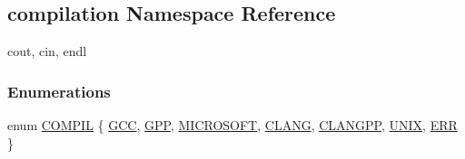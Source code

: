 \hypertarget{namespacecompilation}{}\subsection{compilation Namespace Reference}
\label{namespacecompilation}


cout, cin, endl  


\subsubsection*{Enumerations}
\begin{DoxyCompactItemize}
\item 
enum \mbox{\hyperlink{namespacecompilation_ab8b552e73f4f5a4912982468f052f089}{C\+O\+M\+P\+IL}} \{ \newline
\mbox{\hyperlink{namespacecompilation_ab8b552e73f4f5a4912982468f052f089a18612fab061fb5a500862d24f90d5caf}{G\+CC}}, 
\mbox{\hyperlink{namespacecompilation_ab8b552e73f4f5a4912982468f052f089a3db140f70bad153a259160096857dd4f}{G\+PP}}, 
\mbox{\hyperlink{namespacecompilation_ab8b552e73f4f5a4912982468f052f089ae1c2380a9921008e2f3adc077e1f9db1}{M\+I\+C\+R\+O\+S\+O\+FT}}, 
\mbox{\hyperlink{namespacecompilation_ab8b552e73f4f5a4912982468f052f089abb9974f523fe4e75785446577ca3af4d}{C\+L\+A\+NG}}, 
\newline
\mbox{\hyperlink{namespacecompilation_ab8b552e73f4f5a4912982468f052f089afddc8723698790f16d5a5b06c4565785}{C\+L\+A\+N\+G\+PP}}, 
\mbox{\hyperlink{namespacecompilation_ab8b552e73f4f5a4912982468f052f089afd22f524e94879fe5d224f5149fd7e54}{U\+N\+IX}}, 
\mbox{\hyperlink{namespacecompilation_ab8b552e73f4f5a4912982468f052f089a4829463c6ad5e4051ec554ca82c3d7f8}{E\+RR}}
 \}
\end{DoxyCompactItemize}
